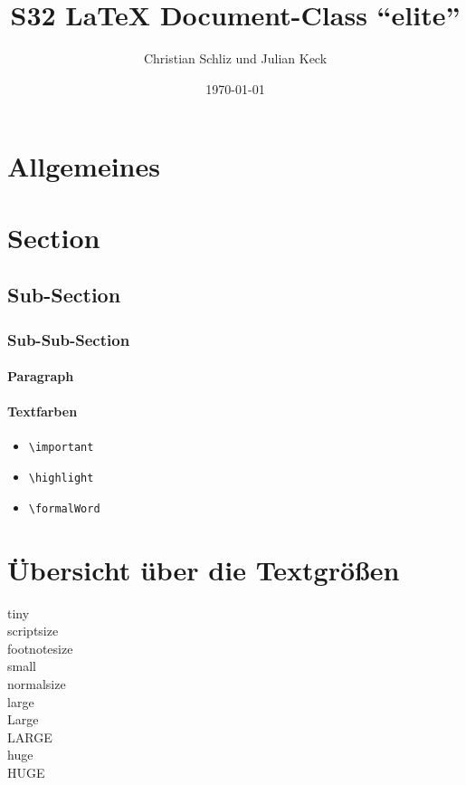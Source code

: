 \documentclass[
    narrow,
    fontstyle=light,
    babelparam=ngerman
]{elite}
\title{S32 \LaTeX{} Document-Class \enquote{elite}}
\author{Christian Schliz und Julian Keck}
\date{\today}
\begin{document}
\maketitle
\tableofcontents
\newpage

\section{Allgemeines}

\section*{Section}
\subsection*{Sub-Section}
\subsubsection*{Sub-Sub-Section}
\paragraph*{Paragraph}

\paragraph*{Textfarben}

\begin{itemize}
    \item \texttt{\textbackslash{}important} 
    \item \texttt{\textbackslash{}highlight} 
    \item \texttt{\textbackslash{}formalWord} 
\end{itemize}

\section{Übersicht über die Textgrößen}

{\tiny tiny}\\
{\scriptsize scriptsize}\\
{\footnotesize footnotesize}\\
{\small small}\\
{\normalsize normalsize}\\
{\large large}\\
{\Large Large}\\
{\LARGE LARGE}\\
{\huge huge}\\
{\Huge HUGE}\\
\end{document}
